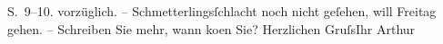 \begin{ledgroupsized}[t]{13cm}
{{{                            S. 9–10.}}}\label{K_L00380_3h} vorzüglich. –\pend
           \pstart
           Schmetterlingsſchlacht noch nicht geſehen,
                    will Freitag gehen. – Schreiben Sie mehr, wann ko{\geminationm}en Sie?\pend
           \pstart Herzlichen Gruſs\hspace*{1.5em}Ihr
                        \spacefill\mbox{Arthur}\pend{}          \endnumbering{}\end{ledgroupsized}  \newcommand{\dateiname}{L00380}\newcommand{\titel}{Arthur Schnitzler an Richard Beer-Hofmann, 9. 10. 1894}\newcommand{\editorInnen}{ Martin Anton Müller und Gerd-Hermann Susen}
            \footnotesize
\begin{ledgroupsized}[t]{11.5cm}
\end{ledgroupsized}
         
      